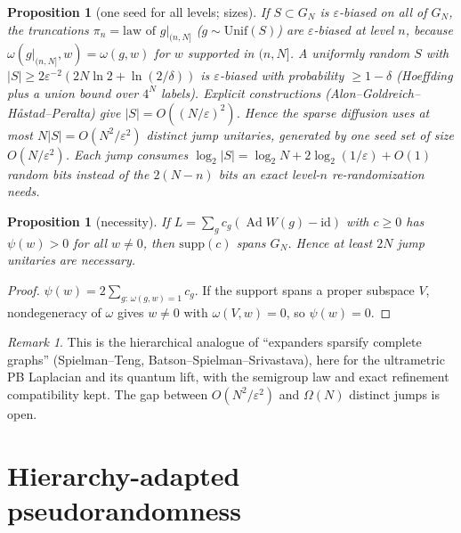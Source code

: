 \documentclass[11pt]{article}
\newtheorem{proposition}[theorem]{Proposition}
\theoremstyle{definition}
\theoremstyle{remark}
\newtheorem{remark}[theorem]{Remark}
\newcommand{\Ad}{\operatorname{Ad}}
\newcommand{\id}{\mathrm{id}}
\begin{document}
\begin{proposition}[one seed for all levels; sizes]\label{prop:seed}
If $S\subset G_N$ is $\varepsilon$-biased on all of $G_N$, the truncations $\pi_n=\text{law of }g|_{(n,N]}$ ($g\sim\mathrm{Unif}(S)$) are $\varepsilon$-biased at level $n$, because $\omega(g|_{(n,N]},w)=\omega(g,w)$ for $w$ supported in $(n,N]$. A uniformly random $S$ with $|S|\ge 2\varepsilon^{-2}(2N\ln2+\ln(2/\delta))$ is $\varepsilon$-biased with probability $\ge1-\delta$ (Hoeffding plus a union bound over $4^N$ labels). Explicit constructions (Alon--Goldreich--H\aa stad--Peralta) give $|S|=O((N/\varepsilon)^2)$. Hence the sparse diffusion uses at most $N|S|=O(N^2/\varepsilon^2)$ distinct jump unitaries, generated by one seed set of size $O(N/\varepsilon^2)$. Each jump consumes $\log_2|S|=\log_2N+2\log_2(1/\varepsilon)+O(1)$ random bits instead of the $2(N-n)$ bits an exact level-$n$ re-randomization needs.
\end{proposition}

\begin{proposition}[necessity]\label{prop:lower}
If $L=\sum_gc_g(\Ad W(g)-\id)$ with $c\ge0$ has $\psi(w)>0$ for all $w\ne0$, then $\mathrm{supp}(c)$ spans $G_N$. Hence at least $2N$ jump unitaries are necessary.
\end{proposition}

\begin{proof}
$\psi(w)=2\sum_{g:\,\omega(g,w)=1}c_g$. If the support spans a proper subspace $V$, nondegeneracy of $\omega$ gives $w\ne0$ with $\omega(V,w)=0$, so $\psi(w)=0$.
\end{proof}

\begin{remark}
This is the hierarchical analogue of ``expanders sparsify complete graphs'' (Spielman--Teng, Batson--Spielman--Srivastava), here for the ultrametric PB Laplacian and its quantum lift, with the semigroup law and exact refinement compatibility kept. The gap between $O(N^2/\varepsilon^2)$ and $\Omega(N)$ distinct jumps is open.
\end{remark}

\section{Hierarchy-adapted pseudorandomness}\label{sec:seed}
\end{document}
